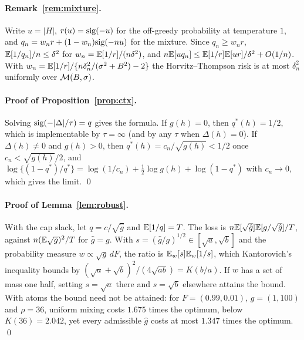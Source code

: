 \paragraph{Remark~\ref{rem:mixture}.} Write $u=|H|$, $r(u)=\mathrm{sig}(-u)$ for the
off-greedy probability at temperature $1$, and
$q_n=w_nr+(1-w_n)\mathrm{sig}(-nu)$ for the mixture. Since $q_n\ge w_nr$,
$\mathbb{E}[1/q_n]/n\le\delta^2$ for $w_n=\mathbb{E}[1/r]/(n\delta^2)$, and
$n\mathbb{E}[uq_n]\le\mathbb{E}[1/r]\mathbb{E}[ur]/\delta^2+O(1/n)$. With
$w_n=\mathbb{E}[1/r]/\{n\delta_n^2/(\sigma^2+B^2)-2\}$ the Horvitz--Thompson risk is at
most $\delta_n^2$ uniformly over $\mathcal{M}(B,\sigma)$.

\paragraph{Proof of Proposition~\ref{prop:ctx}.} Solving
$\mathrm{sig}(-|\Delta|/\tau)=q$ gives the formula. If $g(h)=0$, then $q^*(h)=1/2$, which
is implementable by $\tau=\infty$ (and by any $\tau$ when $\Delta(h)=0$). If
$\Delta(h)\neq0$ and $g(h)>0$, then $q^*(h)=c_n/\sqrt{g(h)}<1/2$ once
$c_n<\sqrt{g(h)}/2$, and
$\log\{(1-q^*)/q^*\}=\log(1/c_n)+\tfrac12\log g(h)+\log(1-q^*)$ with
$c_n\to0$, which gives the limit. \qed

\paragraph{Proof of Lemma~\ref{lem:robust}.} With the cap slack, let
$q=c/\sqrt{\hat g}$ and $\mathbb{E}[1/q]=T$. The loss is $n\mathbb{E}[\sqrt{\hat g}]\mathbb{E}[g/\sqrt{\hat g}]/T$, against
$n(\mathbb{E}\sqrt g)^2/T$ for $\hat g=g$. With $s=(\hat g/g)^{1/2}\in[\sqrt a,\sqrt b]$
and the probability measure $w\propto\sqrt g\,dF$, the ratio is
$\mathbb{E}_w[s]\mathbb{E}_w[1/s]$, which Kantorovich's inequality bounds by
$(\sqrt a+\sqrt b)^2/(4\sqrt{ab})=K(b/a)$. If $w$ has a set of mass one half,
setting $s=\sqrt a$ there and $s=\sqrt b$ elsewhere attains the bound. With
atoms the bound need not be attained: for $F=(0.99,0.01)$, $g=(1,100)$ and
$\rho=36$, uniform mixing costs $1.675$ times the optimum, below $K(36)=2.042$,
yet every admissible $\hat g$ costs at most $1.347$ times the optimum. \qed
